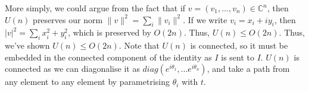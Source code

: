 More simply, we could argue from the fact that if $ v = ( v_1 , \dots, v_{ n  }) \in \mathbb{ C} ^ n$, 
then $ U ( n ) $ preserves our norm $ \| v \|^ 2   = \sum_i \| v_ i  \|^ 2  $. 
If we write $ v_{i } = x_ i + i y_ i $, then $ | v| ^ 2 = \sum_i x_i ^ 2 + y_i ^ 2 $, 
which is preserved by  $ O ( 2n ) $. Thus, $ U ( n ) \leq O ( 2n ) $. 
Thus, we've shown $ U ( n ) \leq O ( 2n ) $. 
Note that $ U ( n ) $ is connected, so it must be embedded in the 
connected component of the identity as $ I $ is sent to $ I $. 
$ U ( n ) $ is connected as we can diagonalise it as $ diag ( e^{ i \theta _ 1 }, \dots e^{ i \theta_ n } ) $, 
and take a path from any element to any element by parametrising $ \theta_ i $
with  $ t$. 

\pagebreak

